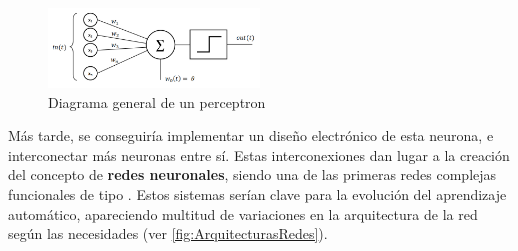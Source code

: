 \begin{figure}[H]
    \centering
    \includegraphics[width=0.5\textwidth]{images/4/perceptron.png}
    \caption{Diagrama general de un perceptron\cite{JgfisherPerceptronPerceptron}}
    \label{fig:Perceptron}
\end{figure}

Más tarde, se conseguiría implementar un diseño electrónico de esta neurona, e interconectar más neuronas entre sí. Estas interconexiones dan lugar a la creación del concepto de \textbf{redes neuronales}, 
siendo una de las primeras redes complejas funcionales de tipo \texttt{}. Estos sistemas serían clave para la evolución del aprendizaje automático, apareciendo multitud de 
variaciones en la arquitectura de la red según las necesidades (ver \autoref{fig:ArquitecturasRedes}).

